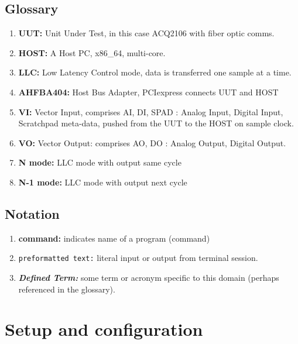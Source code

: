 \documentclass{article}
\begin{document}
\subsection{Glossary}
\begin{enumerate}
	\item \textbf{UUT:} Unit Under Test, in this case ACQ2106 with fiber optic comms.
	\item \textbf{HOST:} A Host PC, x86\_64, multi-core.
	\item \textbf{LLC:} Low Latency Control mode, data is transferred one sample at a time.
	\item \textbf{AHFBA404:} Host Bus Adapter, PCIexpress connects UUT and HOST
	\item \textbf{VI:} Vector Input, comprises AI, DI, SPAD : Analog Input, Digital Input, Scratchpad meta-data, pushed from the UUT to the HOST on sample clock.
	\item \textbf{VO:} Vector Output: comprises AO, DO : Analog Output, Digital Output.
	\item \textbf{N mode:} LLC mode with output same cycle
	\item \textbf{N-1 mode:} LLC mode with output next cycle
\end{enumerate}

\subsection{Notation}
\begin{enumerate}
	\item \textbf{command:} indicates name of a program (command)
	\item \verb|preformatted text:| literal input or output from terminal session.
	\item \emph{\textbf{Defined Term:}} some term or acronym specific to this domain (perhaps referenced in the glossary).
\end{enumerate}


\section{Setup and configuration} \label{setup}
\end{document}

